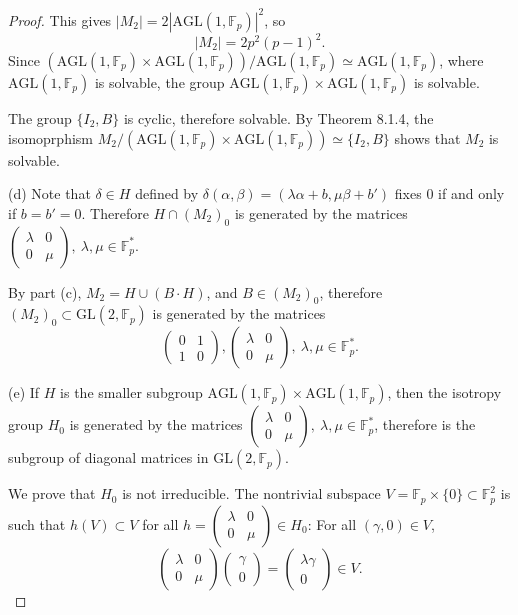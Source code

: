 \documentclass[11pt,a4paper]{article}
\newcommand{\F}{\mathbb{F}}
\begin{document}
{\begin{proof}
This gives $|M_2| = 2 |\mathrm{AGL}(1,\F_p)|^2$, so
$$|M_2| = 2p^2(p-1)^2.$$
Since $(\mathrm{AGL}(1,\F_p) \times \mathrm{AGL}(1,\F_p))/\mathrm{AGL}(1,\F_p) \simeq \mathrm{AGL}(1,\F_p)$, where $\mathrm{AGL}(1,\F_p)$ is solvable, the group $\mathrm{AGL}(1,\F_p) \times \mathrm{AGL}(1,\F_p)$ is solvable.

The group $\{I_2,B\}$ is cyclic, therefore solvable. By Theorem 8.1.4, the isomoprphism $M_2/ (\mathrm{AGL}(1,\F_p) \times \mathrm{AGL}(1,\F_p)) \simeq \{I_2,B\}$ shows that $M_2$ is solvable.

\item[(d)] Note that $\delta \in H$ defined by $\delta(\alpha,\beta) = (\lambda \alpha+b, \mu  \beta + b')$ fixes $0$ if and only if $b = b' = 0$. Therefore $H \cap (M_2)_0$ is generated by the matrices 
$
\begin{pmatrix}
\lambda & 0\\
0&\mu
\end{pmatrix} 
,\ \lambda,\mu \in \F_p^*$.

By part (c), $M_2 = H \cup (B\cdot H)$, and $B \in (M_2)_0$, therefore $(M_2)_0 \subset \mathrm{GL}(2,\F_p)$ is generated by the matrices
$$
\begin{pmatrix}
0&1\\
1&0
\end{pmatrix},
\begin{pmatrix}
\lambda & 0\\
0&\mu
\end{pmatrix} 
,\ \lambda,\mu \in \F_p^*.
$$

\item[(e)] If $H$ is the smaller subgroup $\mathrm{AGL}(1,\F_p) \times \mathrm{AGL}(1,\F_p)$, then the isotropy group $H_0$ is generated by the matrices 
$
\begin{pmatrix}
\lambda & 0\\
0&\mu
\end{pmatrix} 
,\ \lambda,\mu \in \F_p^*$, therefore is the subgroup of diagonal matrices in $\mathrm{GL}(2,\F_p)$.

We prove that $H_0$ is not irreducible. The nontrivial subspace $V = \F_p \times \{0\} \subset \F_p^2$ is such that $h(V) \subset V$ for all $h = \begin{pmatrix}
\lambda & 0\\
0&\mu
\end{pmatrix} \in H_0$: For all $(\gamma,0) \in V$,
$$
\begin{pmatrix}
\lambda & 0\\
0&\mu
\end{pmatrix}
\begin{pmatrix}
\gamma\\
0
\end{pmatrix}
=
\begin{pmatrix}
\lambda \gamma\\
0
\end{pmatrix}
\in V.
$$
\end{proof}

}
\end{document}
